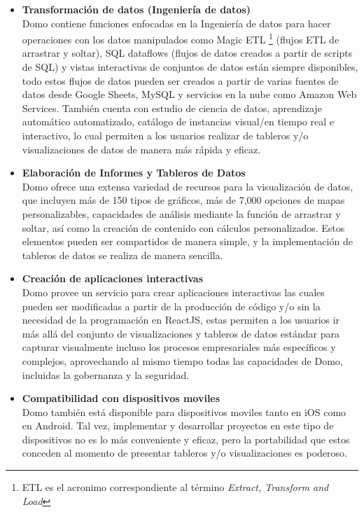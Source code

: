 \begin{itemize}
    \item \textbf{Transformación de datos (Ingeniería de datos)}\\
    Domo contiene funciones enfocadas en la Ingeniería de datos para hacer operaciones con los datos manipulados como Magic ETL \footnote{ETL es el acronimo correspondiente al término \textit{Extract, Transform and Load}} (flujos ETL de arrastrar y soltar), SQL dataflows (flujos de datos creados a partir de scripts de SQL) y vistas interactivas de conjuntos de datos están siempre disponibles, todo estos flujos de datos pueden ser creados a partir de varias fuentes de datos desde Google Sheets, MySQL y servicios en la nube como Amazon Web Services. También cuenta con estudio de ciencia de datos, aprendizaje automático automatizado, catálogo de instancias visual/en tiempo real e interactivo, lo cual permiten a los usuarios realizar de tableros y/o visualizaciones de datos de manera más rápida y eficaz.

    
    \item \textbf{Elaboración de Informes y Tableros de Datos}\\
    Domo ofrece una extensa variedad de recursos para la visualización de datos, que incluyen más de 150 tipos de gráficos, más de 7,000 opciones de mapas personalizables, capacidades de análisis mediante la función de arrastrar y soltar, así como la creación de contenido con cálculos personalizados. Estos elementos pueden ser compartidos de manera simple, y la implementación de tableros de datos se realiza de manera sencilla.

    \item \textbf{Creación de aplicaciones interactivas}\\
    Domo provee un servicio para crear aplicaciones interactivas las cuales pueden ser modificadas a partir de la producción de código y/o sin la necesidad de la programación en ReactJS, estas permiten a los usuarios ir más allá del conjunto de visualizaciones y tableros de datos estándar para capturar visualmente incluso los procesos empresariales más específicos y complejos, aprovechando al mismo tiempo todas las capacidades de Domo, incluidas la gobernanza y la seguridad.

    \item  \textbf{Compatibilidad con dispositivos moviles}\\
    Domo también está disponible para dispositivos moviles tanto en iOS como en Android. Tal vez, implementar y desarrollar proyectos en este tipo de dispositivos no es lo más conveniente y eficaz, pero la portabilidad que estos conceden al momento de presentar tableros y/o visualizaciones es poderoso. 
    
    
\end{itemize}

